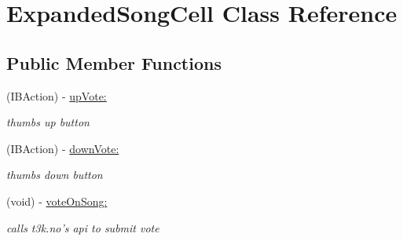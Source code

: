 \hypertarget{interface_expanded_song_cell}{\section{Expanded\-Song\-Cell Class Reference}
\label{interface_expanded_song_cell}
}
\subsection*{Public Member Functions}
\begin{DoxyCompactItemize}
\item 
(I\-B\-Action) -\/ \hyperlink{interface_expanded_song_cell_ad753b39854964d8c4244af1cea0b557d}{up\-Vote\-:}
\begin{DoxyCompactList}\small\item\em thumbs up button \end{DoxyCompactList}\item 
(I\-B\-Action) -\/ \hyperlink{interface_expanded_song_cell_a6d149d2ab6c5b797b2bdfb0aa9016642}{down\-Vote\-:}
\begin{DoxyCompactList}\small\item\em thumbs down button \end{DoxyCompactList}\item 
(void) -\/ \hyperlink{interface_expanded_song_cell_a5fa6f1d8bf956bde08f405b1f719faff}{vote\-On\-Song\-:}
\begin{DoxyCompactList}\small\item\em calls t3k.\-no's api to submit vote \end{DoxyCompactList}\end{DoxyCompactItemize}
